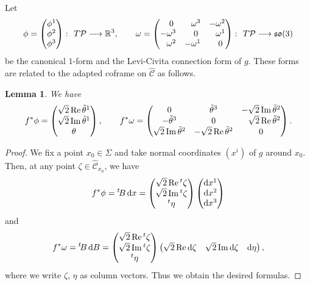 \documentclass[pdftex]{sigma}
\newcommand\ol{\overline}
\newcommand{\wh}{\widehat}
\numberwithin{equation}{section}
\newtheorem{Lemma}[Theorem]{Lemma}
\begin{document}
Let
\[
\phi=\begin{pmatrix}
\phi^1 \\ \phi^2 \\ \phi^3
\end{pmatrix}
\colon\ T\mathcal{P}\longrightarrow \mathbb{R}^3, \qquad \omega=\begin{pmatrix}
\hphantom{-}0 & \hphantom{-}\omega^3 & -\omega^2 \\
-\omega^3 & \hphantom{-}0 & \hphantom{-}\omega^1 \\
\hphantom{-}\omega^2 & -\omega^1 & \hphantom{-}0
\end{pmatrix}
\colon\ T\mathcal{P}\longrightarrow \mathfrak{so}(3)
\]
be the canonical $1$-form and the Levi-Civita connection form of $g$.
These forms are related to the adapted coframe \smash{$\bigl\{\theta, \tilde\theta^1, \tilde\theta^2, \tilde\theta^{\ol1}, \tilde\theta^{\ol2}, \tilde\theta^3\bigr\}$} on $\wh{\mathcal{C}}$ as follows.
\begin{Lemma}
We have
\[
f^*\phi=
\begin{pmatrix}
\sqrt{2}\operatorname{Re}\tilde\theta^1 \\
\sqrt{2}\operatorname{Im}\tilde\theta^1 \\
\theta
\end{pmatrix}, \qquad
f^*\omega=\begin{pmatrix}
0 & \tilde\theta^3 & -\sqrt{2}\operatorname{Im}\tilde\theta^2 \\
-\tilde\theta^3 & 0 & \hphantom{-}\sqrt{2}\operatorname{Re}\tilde\theta^2 \\
\sqrt{2}\operatorname{Im}\tilde\theta^2 & -\sqrt{2}\operatorname{Re}\tilde\theta^2& 0
\end{pmatrix}.
\]
\end{Lemma}
\begin{proof}
We fix a point $x_0\in\Sigma$ and take normal coordinates $(x^i)$ of $g$ around
$x_0$. Then, at any point $\zeta\in \wh{\mathcal{C}}_{x_0}$, we have
\[
f^*\phi={}^t \!B\, {\rm d}x =\begin{pmatrix}
\sqrt{2}\operatorname{Re}{}^t\zeta \\
\sqrt{2}\operatorname{Im}{}^t\zeta \\
{}^t\eta
\end{pmatrix}
\begin{pmatrix}
{\rm d}x^1 \\ {\rm d}x^2 \\ {\rm d}x^3
\end{pmatrix}
\]
and
\[
f^*\omega={}^t\!B\,{\rm d}B=
\begin{pmatrix}
\sqrt{2}\operatorname{Re}{}^t\zeta \\
\sqrt{2}\operatorname{Im}{}^t\zeta \\
{}^t\eta
\end{pmatrix}
\begin{pmatrix}
\sqrt{2}\operatorname{Re}{\rm d}\zeta & \sqrt{2}\operatorname{Im} {\rm d}\zeta & {\rm d}\eta
\end{pmatrix},
\]
where we write $\zeta$, $\eta$ as column vectors. Thus we obtain the desired formulas.
\end{proof}
\end{document}
